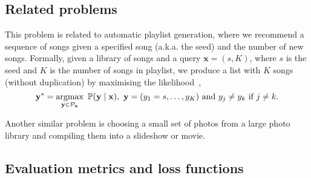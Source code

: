 \subsection{Related problems}
\label{sec:related}

This problem is related to automatic playlist generation, 
where we recommend a sequence of songs given a specified song (a.k.a. the seed) and the number of new songs.
Formally, given a library of songs and a query $\mathbf{x} = (s, K)$, where $s$ is the seed and $K$ is the number of songs in playlist,
we produce a list with $K$ songs (without duplication) by maximising the likelihood~\cite{chen2012playlist},
\begin{equation*}
\mathbf{y}^* = \operatorname*{argmax}_{\mathbf{y} \in \mathcal{P}_\mathbf{x}}~ \mathbb{P}(\mathbf{y} \mid \mathbf{x}),~ \mathbf{y} = (y_1=s,\dots,y_K) 
~\text{and}~ y_j \ne y_k ~\text{if}~ j \ne k.
\end{equation*}

Another similar problem is choosing a small set of photos from a large photo library and compiling them into a slideshow or movie.



\subsection{Evaluation metrics and loss functions}
\label{sec:evaluation}

